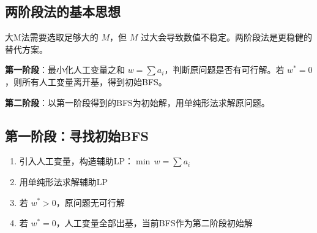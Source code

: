 \subsection{两阶段法的基本思想}

大M法需要选取足够大的 $M$，但 $M$ 过大会导致数值不稳定。两阶段法是更稳健的替代方案。

\begin{conceptbox}[两阶段法]
\textbf{第一阶段}：最小化人工变量之和 $w = \sum a_i$，判断原问题是否有可行解。若 $w^* = 0$，则所有人工变量离开基，得到初始BFS。

\textbf{第二阶段}：以第一阶段得到的BFS为初始解，用单纯形法求解原问题。
\end{conceptbox}

\subsection{第一阶段：寻找初始BFS}

\begin{algobox}[第一阶段算法]
\begin{enumerate}
    \item 引入人工变量，构造辅助LP：$\min \, w = \sum a_i$
    \item 用单纯形法求解辅助LP
    \item 若 $w^* > 0$，原问题无可行解
    \item 若 $w^* = 0$，人工变量全部出基，当前BFS作为第二阶段初始解
\end{enumerate}
\end{algobox}

